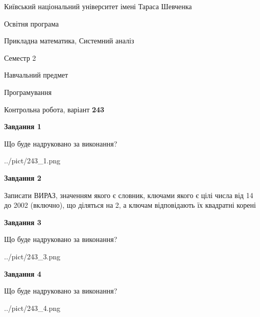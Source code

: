\documentclass[12pt, ukrainian]{article}
\begin{document}
{{\begin {small}\par
{ \center  Київський національний університет імені Тараса Шевченка \par}
{\parbox {5 cm}{Освітня програма \hfill}{\parbox {8 cm}{Прикладна математика, Системний аналіз \hfill}}\parbox {5 cm}{\hfill Семестр 2}}\par
{\parbox {5 cm} {Навчальний предмет \hfill}\parbox {7 cm}{Програмування \hfill}\parbox {6cm}{\hfill}\par}\vspace{-7pt} \end{small}}{\center Контрольна робота, варіант  \No \textbf
{ 243 }\par}}
{
\begin {large}
{\begin {center}\textbf{Завдання 1}\end {center}}\par
Що буде надруковано за виконання?\par\par
\begin{center}
	{../pict/243_1.png}
\end{center}
\newpage

{\begin {center}\textbf{Завдання 2}\end {center}}\par
Записати ВИРАЗ, значенням якого є словник, ключами якого є цілі числа від 14 до 2002 (включно), що діляться на 2, а ключам відповідають їх квадратні корені\par
\newpage

{\begin {center}\textbf{Завдання 3}\end {center}}\par
Що буде надруковано за виконання?\par
\begin{center}
	{../pict/243_3.png}
\end{center}
\newpage

{\begin {center}\textbf{Завдання 4}\end {center}}\par
Що буде надруковано за виконання?\par
\begin{center}
	{../pict/243_4.png}
\end{center}
\newpage


\end{large}}
\end{document}
